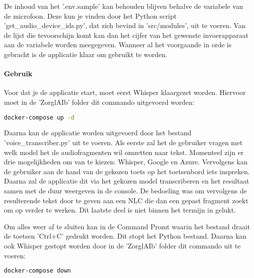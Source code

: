 De inhoud van het '.env.sample' kan behouden blijven behalve de variabele van de microfoon. Deze kun je vinden door het Python script 'get\_audio\_device\_ids.py', dat zich bevind in 'src/modules', uit te voeren. Van de lijst die tevoorschijn komt kan dan het cijfer van het gewenste invoerapparaat aan de variabele worden meegegeven. Wanneer al het voorgaande in orde is gebracht is de applicatie klaar om gebruikt te worden.

\paragraph{Gebruik}
Voor dat je de applicatie start, moet eerst Whisper klaargezet worden. Hiervoor moet in de 'ZorglAIb' folder dit commando uitgevoerd worden:

\begin{lstlisting}[language=bash]
    docker-compose up -d
\end{lstlisting}

Daarna kan de applicatie worden uitgevoerd door het bestand 'voice\_transcriber.py' uit te voeren. Als eerste zal het de gebruiker vragen met welk model het de audiofragmenten wil omzetten naar tekst. Momenteel zijn er drie mogelijkheden om van te kiezen: Whisper, Google en Azure. Vervolgens kan de gebruiker aan de hand van de gekozen toets op het toetsenbord iets inspreken. Daarna zal de applicatie dit via het gekozen model transcriberen en het resultaat samen met de duur weergeven in de console. De bedoeling was om vervolgens de resulterende tekst door te geven aan een NLC die dan een gepast fragment zoekt om op verder te werken. Dit laatste deel is niet binnen het termijn in gelukt.

Om alles weer af te sluiten kan in de Command Promt waarin het bestand draait de toetsen 'Ctrl+C' gedrukt worden. Dit stopt het Python bestand. Daarna kan ook Whisper gestopt worden door in de 'ZorglAIb' folder dit commando uit te voeren:

\begin{lstlisting}[language=bash]
    docker-compose down
\end{lstlisting}
